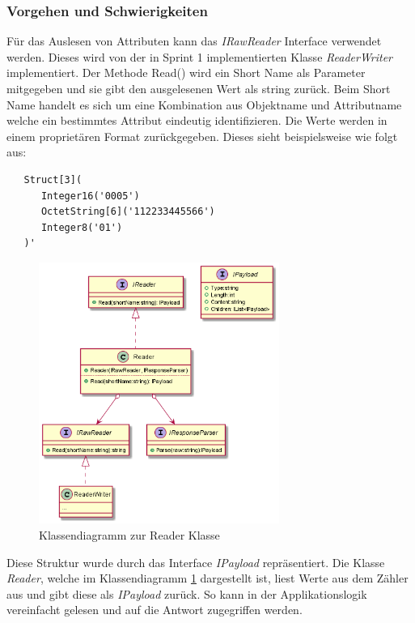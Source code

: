 \subsubsection{Vorgehen und Schwierigkeiten}\label{readAttributVorgehen}
Für das Auslesen von Attributen kann das \textit{IRawReader} Interface verwendet werden.
Dieses wird von der in Sprint 1 implementierten Klasse \textit{ReaderWriter} implementiert.
Der Methode Read() wird ein Short Name als Parameter mitgegeben und sie gibt den ausgelesenen Wert als string zurück.
Beim Short Name handelt es sich um eine Kombination aus Objektname und Attributname welche ein bestimmtes Attribut eindeutig identifizieren.
Die Werte werden in einem proprietären Format zurückgegeben. 
Dieses sieht beispielsweise wie folgt aus:
\begin{verbatim}
   Struct[3](
      Integer16('0005')
      OctetString[6]('112233445566')
      Integer8('01')
   )'
\end{verbatim}
\begin{figure}
\centering
\includegraphics[width=0.7\textwidth]{gfx/string_toPayload.png}
\caption{
   Klassendiagramm zur Reader Klasse
   }
   \label{fig:reader}
\end{figure}
Diese Struktur wurde durch das Interface \textit{IPayload} repräsentiert.
Die Klasse \textit{Reader}, welche im Klassendiagramm \ref{fig:reader} dargestellt ist, liest Werte aus dem Zähler aus und gibt diese als \textit{IPayload} zurück.
So kann in der Applikationslogik vereinfacht gelesen und auf die Antwort zugegriffen werden.

